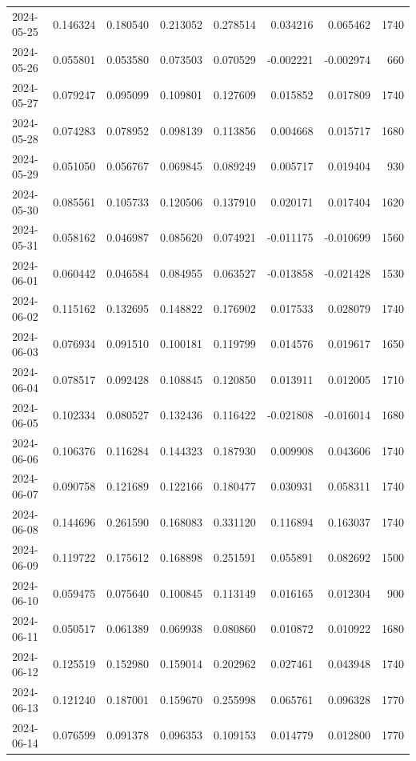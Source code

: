 \begin{tabular}{lrrrrrrr}
2024-05-25 & 0.146324 & 0.180540 & 0.213052 & 0.278514 & 0.034216 & 0.065462 & 1740 \\
2024-05-26 & 0.055801 & 0.053580 & 0.073503 & 0.070529 & -0.002221 & -0.002974 & 660 \\
2024-05-27 & 0.079247 & 0.095099 & 0.109801 & 0.127609 & 0.015852 & 0.017809 & 1740 \\
2024-05-28 & 0.074283 & 0.078952 & 0.098139 & 0.113856 & 0.004668 & 0.015717 & 1680 \\
2024-05-29 & 0.051050 & 0.056767 & 0.069845 & 0.089249 & 0.005717 & 0.019404 & 930 \\
2024-05-30 & 0.085561 & 0.105733 & 0.120506 & 0.137910 & 0.020171 & 0.017404 & 1620 \\
2024-05-31 & 0.058162 & 0.046987 & 0.085620 & 0.074921 & -0.011175 & -0.010699 & 1560 \\
2024-06-01 & 0.060442 & 0.046584 & 0.084955 & 0.063527 & -0.013858 & -0.021428 & 1530 \\
2024-06-02 & 0.115162 & 0.132695 & 0.148822 & 0.176902 & 0.017533 & 0.028079 & 1740 \\
2024-06-03 & 0.076934 & 0.091510 & 0.100181 & 0.119799 & 0.014576 & 0.019617 & 1650 \\
2024-06-04 & 0.078517 & 0.092428 & 0.108845 & 0.120850 & 0.013911 & 0.012005 & 1710 \\
2024-06-05 & 0.102334 & 0.080527 & 0.132436 & 0.116422 & -0.021808 & -0.016014 & 1680 \\
2024-06-06 & 0.106376 & 0.116284 & 0.144323 & 0.187930 & 0.009908 & 0.043606 & 1740 \\
2024-06-07 & 0.090758 & 0.121689 & 0.122166 & 0.180477 & 0.030931 & 0.058311 & 1740 \\
2024-06-08 & 0.144696 & 0.261590 & 0.168083 & 0.331120 & 0.116894 & 0.163037 & 1740 \\
2024-06-09 & 0.119722 & 0.175612 & 0.168898 & 0.251591 & 0.055891 & 0.082692 & 1500 \\
2024-06-10 & 0.059475 & 0.075640 & 0.100845 & 0.113149 & 0.016165 & 0.012304 & 900 \\
2024-06-11 & 0.050517 & 0.061389 & 0.069938 & 0.080860 & 0.010872 & 0.010922 & 1680 \\
2024-06-12 & 0.125519 & 0.152980 & 0.159014 & 0.202962 & 0.027461 & 0.043948 & 1740 \\
2024-06-13 & 0.121240 & 0.187001 & 0.159670 & 0.255998 & 0.065761 & 0.096328 & 1770 \\
2024-06-14 & 0.076599 & 0.091378 & 0.096353 & 0.109153 & 0.014779 & 0.012800 & 1770 \\

\end{tabular}
